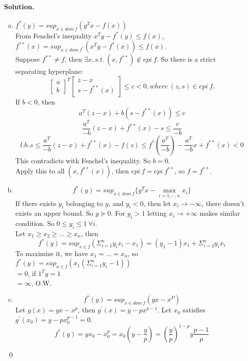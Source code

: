 \documentclass[a4paper]{article}
\newenvironment{solution}
{\color{blue} \paragraph{Solution.}}
{\newline \qed}
\begin{document}
\begin{solution}
\begin{enumerate}[a)]

    \item $f^*(y) = sup_{x \in dom\ f}(y^Tx - f(x))$\\
            From Fenchel's inequality $x^Ty - f^*(y) \leq f(x)$, $f^{**}(x) = sup_{x \in dom\ f^*}(x^Ty - f^*(x)) \leq f(x)$.\\
            Suppose $f^{**} \ne f$, then $\exists x, s.t.\ (x , f^{**}) \notin epi\ f$. So there is a strict separating hyperplane: $$
            \begin{bmatrix} a \\ b \end{bmatrix} ^T
            \begin{bmatrix} z - x \\ s - f^{**} (x)\end{bmatrix}
            \leq c < 0, where\ (z,s) \in epi\ f.$$
            If $b < 0$, then $$a^T(z - x) + b(s - f^{**} (x)) \leq c$$
            $$\frac{a^T}{-b} (z - x) + f^{**} (x) - s \leq \frac{c}{-b}$$
            $$l.h.s \leq \frac{a^T}{-b} (z - x) + f^{**} (x) - f(z)
                    \leq f^* (\frac{a^T}{-b}) - \frac{a^T}{-b} x + f^{**}(x) < 0$$
            This contradicts with Fenchel's inequality.
            So $b = 0$.\\
            Apply this to all $(x , f^{**}(x))$, then $epi\ f = epi\ f^{**}$, so $f = f^{**}$.
            
    \item $$f^* (y) = sup_{x \in dom\ f} \{ y^Tx - \max_{i=1, \cdots, n} x_i \}$$
            If there exists $y_i$ belonging to $y$, and $y_i < 0$, then let $x_i \rightarrow -\infty$, there doesn't exists an upper bound. So $y \succeq 0$. For $y_i > 1$ letting $x_i \rightarrow +\infty$ makes similar condition. So $0 \leq y_i \leq 1\ \forall i$.\\
            Let $x_1 \geq x_2 \geq \dots \geq x_n$, then
            $$f^*(y) = sup_{x \in f} (\Sigma _{i = 1} ^n y_i x_i - x_1) = (y_1 - 1)x_1 + \Sigma_{i = 2}^n y_i x_i$$
            To maximize it, we have $x_1 = \dots = x_n$, so $f^*(y) = sup_{x\in f}(x_1 (\Sigma_{i = 1} ^n y_i - 1))$\\
            $= 0$, if $1^Ty = 1$ \\ $ = \infty$, O.W.

    \item $$f^* (y) = sup_{x \in dom\ f} ( yx - x^P )$$
            Let $g(x) = yx - x^p$, then $g^{'}(x) = y - px^{p - 1}$. Let $x_0$ satisfies $g^{'} (x_0) = y - px_0^{p - 1} = 0$.
            $$f^{*}(y) = yx_0 - x_0^p = x_0(y - \frac{y}{p}) = (\frac{y}{p})^{1-p} y \frac{p - 1}{p}$$
\end{enumerate}
\
\end{solution}
\end{document}
